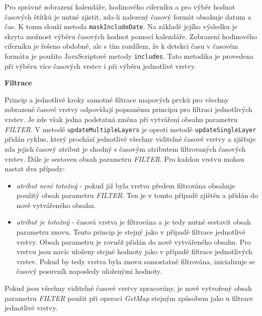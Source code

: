 Pro správné zobrazení kalendáře, hodinového ciferníku a
pro výběr hodnot časových štítků je nutné zjistit, zda-li
nalezený časový formát obsahuje datum a čas. K tomu slouží metoda
\verb|maskIncludeDate|. Na základě jejího výsledku je skryta možnost
výběru časových hodnot pomocí kalendáře. Zobrazení hodinového
ciferníku je řešeno obdobně, ale s tím rozdílem, že k detekci času v
časovém formátu je použito JavaScriptové metody \verb|includes|. Tato
metodika je provedena při výběru více časových vrstev i při
výběru jednotlivé vrstvy.

\bigskip
\noindent \textbf{Filtrace}

Princip a jednotlivé kroky samotné filtrace mapových prvků pro všechny
zobrazené časové vrstvy odpovídají popsanému principu pro filtraci
jednotlivých vrstev. Je zde však jedna podstatná změna při vytváření
obsahu parametru \textit{FILTER}. V metodě \verb|updateMultipleLayers| je
oproti metodě \verb|updateSingleLayer| přidán cyklus, který prochází
jednotlivě všechny viditelné časové vrstvy a zjišťuje zda jejich
časový atribut je shodný s časovým atributem filtrovaných časových
vrstev. Dále je sestaven obsah parametru \textit{FILTER}. Pro každou vrstvu
mohou nastat dva případy:
\begin{itemize}
\item\textit{atribut není totožný} - pokud již byla
vrstva předem filtrována obsahuje použitý obsah parametru
\textit{FILTER}. Ten je v tomto případě zjištěn a
přidán do nově vytvářeného obsahu.
\item\textit{atribut je totožný} - časová vrstva je
filtrována a je tedy nutné sestavit obsah parametru
znovu. Tento princip je stejný jako v případě filtrace
jednotlivé vrstvy. Obsah parametru je rovněž přidán do
nově vytvářeného obsahu. Pro vrstvu jsou navíc uloženy
stejné hodnoty jako v případě filtrace jednotlivých
vrstev. Pokud by tedy vrstva byla znovu samostatně
filtrována, inicializuje se časový posuvník naposledy
uloženými hodnoty.
\end{itemize}
Pokud jsou všechny viditelné časové vrstvy zpracovány, je nově vytvořený
obsah parametru \textit{FILTER} použit při operaci \textit{GetMap} stejným
způsobem jako u filtrace jednotlivé vrstvy.

